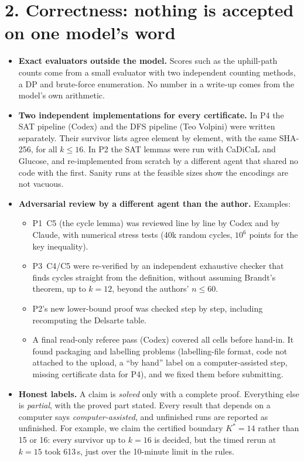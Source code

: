 \documentclass[10pt]{article}
\begin{document}
\section*{2. Correctness: nothing is accepted on one model's word}
\begin{itemize}
\item \textbf{Exact evaluators outside the model.} Scores such as the uphill-path counts come from a small evaluator with two independent counting methods, a DP and brute-force enumeration. No number in a write-up comes from the model's own arithmetic.
\item \textbf{Two independent implementations for every certificate.} In P4 the SAT pipeline (Codex) and the DFS pipeline (Teo Volpini) were written separately. Their survivor lists agree element by element, with the same SHA-256, for all $k\le16$. In P2 the SAT lemmas were run with CaDiCaL and Glucose, and re-implemented from scratch by a different agent that shared no code with the first. Sanity runs at the feasible sizes show the encodings are not vacuous.
\item \textbf{Adversarial review by a different agent than the author.} Examples:
  \begin{itemize}
  \item P1~C5 (the cycle lemma) was reviewed line by line by Codex and by Claude, with numerical stress tests (40k random cycles, $10^6$ points for the key inequality).
  \item P3~C4/C5 were re-verified by an independent exhaustive checker that finds cycles straight from the definition, without assuming Brandt's theorem, up to $k=12$, beyond the authors' $n\le60$.
  \item P2's new lower-bound proof was checked step by step, including recomputing the Delsarte table.
  \item A final read-only referee pass (Codex) covered all cells before hand-in. It found packaging and labelling problems (labelling-file format, code not attached to the upload, a ``by hand'' label on a computer-assisted step, missing certificate data for P4), and we fixed them before submitting.
  \end{itemize}
\item \textbf{Honest labels.} A claim is \emph{solved} only with a complete proof. Everything else is \emph{partial}, with the proved part stated. Every result that depends on a computer says \emph{computer-assisted}, and unfinished runs are reported as unfinished. For example, we claim the certified boundary $K^\ast=14$ rather than 15 or 16: every survivor up to $k=16$ is decided, but the timed rerun at $k=15$ took 613\,s, just over the 10-minute limit in the rules.
\end{itemize}
\end{document}
